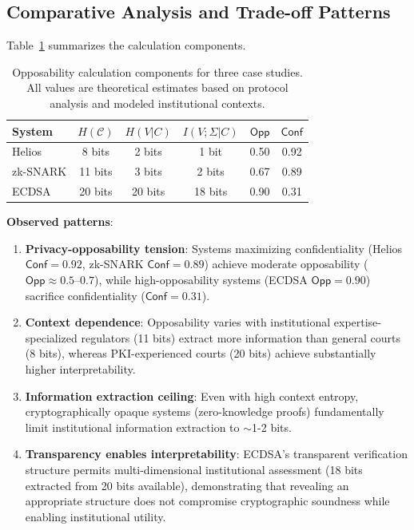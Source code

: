\documentclass{ieeeaccess}
\begin{document}
\subsection{Comparative Analysis and Trade-off Patterns}\label{app:comparison}

Table~\ref{tab:opp_calc_summary} summarizes the calculation components.

\begin{table}[h]
\centering
\begin{tabular}{lccccc}
\toprule
\textbf{System} & $H(\mathcal{C})$ & $H(V|C)$ & $I(V;\Sigma|C)$ & $\mathsf{Opp}$ & $\mathsf{Conf}$ \\
\midrule
Helios & 8 bits & 2 bits & 1 bit & 0.50 & 0.92 \\
zk-SNARK & 11 bits & 3 bits & 2 bits & 0.67 & 0.89 \\
ECDSA & 20 bits & 20 bits & 18 bits & 0.90 & 0.31 \\
\bottomrule
\end{tabular}
\caption{Opposability calculation components for three case studies. All values are theoretical estimates based on protocol analysis and modeled institutional contexts.}
\label{tab:opp_calc_summary}
\end{table}

\textbf{Observed patterns}:
\begin{enumerate}
\item \textbf{Privacy-opposability tension}: Systems maximizing confidentiality (Helios $\mathsf{Conf}=0.92$, zk-SNARK $\mathsf{Conf}=0.89$) achieve moderate opposability ($\mathsf{Opp} \approx 0.5\text{--}0.7$), while high-opposability systems (ECDSA $\mathsf{Opp}=0.90$) sacrifice confidentiality ($\mathsf{Conf}=0.31$).

\item \textbf{Context dependence}: Opposability varies with institutional expertise-specialized regulators (11 bits) extract more information than general courts (8 bits), whereas PKI-experienced courts (20 bits) achieve substantially higher interpretability.

\item \textbf{Information extraction ceiling}: Even with high context entropy, cryptographically opaque systems (zero-knowledge proofs) fundamentally limit institutional information extraction to $\sim$1-2 bits.

\item \textbf{Transparency enables interpretability}: ECDSA's transparent verification structure permits multi-dimensional institutional assessment (18 bits extracted from 20 bits available), demonstrating that revealing an appropriate structure does not compromise cryptographic soundness while enabling institutional utility.
\end{enumerate}
\end{document}
